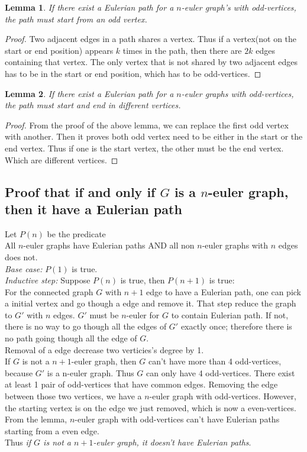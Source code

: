 \documentclass[letter]{article}
\newtheorem{lma}{Lemma}
\begin{document}
\begin{lma}
If there exist a Eulerian path for a $n$-euler graph's with odd-vertices, the path must start from an odd vertex.
\end{lma}
\begin{proof}
Two adjacent edges in a path shares a vertex. Thus if a vertex(not on the start or end position) appears $k$ times in the path, then there are $2k$ edges containing that vertex. The only vertex that is not shared by two adjacent edges has to be in the start or end position, which has to be odd-vertices.
\end{proof}

\begin{lma}
If there exist a Eulerian path for a $n$-euler graphs with odd-vertices, the path must start and end in different vertices.
\end{lma}
\begin{proof}
From the proof of the above lemma, we can replace the first odd vertex with another. Then it proves both odd vertex need to be either in the start or the end vertex. Thus if one is the start vertex, the other must be the end vertex. Which are different vertices.
\end{proof}

\subsection*{Proof that if and only if $G$ is a $n$-euler graph, then it have a Eulerian path}
Let $P(n)$ be the predicate\\
All $n$-euler graphs have Eulerian paths AND all non $n$-euler graphs with $n$ edges does not.\\
\emph{Base case:}  $P(1)$ is true.\\
\emph{Inductive step:} Suppose $P(n)$ is true, then $P(n+1)$ is true:\\
For the connected graph $G$ with $n+1$ edge to have a Eulerian path, one can pick a initial vertex and go though a edge and remove it. That step reduce the graph to $G'$ with $n$ edges. $G'$ must be $n$-euler for $G$ to contain Eulerian path. If not, there is no way to go though all the edges of $G'$ exactly once; therefore there is no path going though all the edge of $G$.\\
Removal of a edge decrease two verticies's degree by 1. \\

If $G$ is not a $n+1$-euler graph, then $G$ can't have more than 4 odd-vertices, because $G'$ is a n-euler graph. Thus $G$ can only have 4 odd-vertices. There exist at least 1 pair of odd-vertices that have common edges. Removing the edge between those two vertices, we have a $n$-euler graph with odd-vertices. However, the starting vertex is on the edge we just removed, which is now a even-vertices. From the lemma, $n$-euler graph with odd-vertices can't have Eulerian paths starting from a even edge. \\
Thus \emph{if $G$ is not a $n+1$-euler graph, it doesn't have Eulerian paths}.\\
\end{document}
